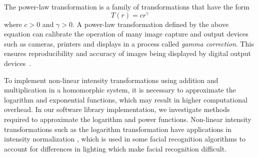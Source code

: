 The power-law transformation is a family of transformations that have the form
\begin{equation}
    T\left(r\right) = c r^{\gamma}
\end{equation}
where $c>0$ and $\gamma > 0$.
A power-law transformation defined by the above equation can calibrate the operation of many image capture and output devices such as cameras, printers and displays in a process called \textit{gamma correction}. This ensures reproducibility and accuracy of images being displayed by digital output devices~\cite{gonzalez_digital_2008}.

To implement non-linear intensity transformations using addition and multiplication in a homomorphic system, it is necessary to approximate the logarithm and exponential functions, which may result in higher computational overhead. In our software library implementation, we investigate methods required to approximate the logarithm and power functions. Non-linear intensity transformations such as the logarithm transformation have applications in intensity normalization \cite{oravec_illumination_2010}, which is used in some facial recognition algorithms to account for differences in lighting which make facial recognition difficult.


